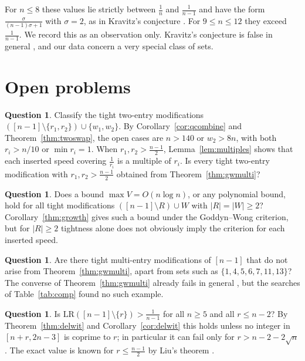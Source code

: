 \documentclass[11pt]{article}
\theoremstyle{definition}
\newtheorem{question}[theorem]{Question}
\newcommand{\LR}{\mathrm{LR}}
\begin{document}
For $n\le8$ these values lie strictly between $\frac1n$ and
$\frac1{n-1}$ and have the form $\frac\sigma{(n-1)\sigma+1}$ with
$\sigma=2$, as in Kravitz's conjecture \cite{Kravitz2021}. For $9\le
n\le12$ they exceed $\frac1{n-1}$. We record this as an observation
only. Kravitz's conjecture is false in general \cite{FanSun2026}, and
our data concern a very special class of sets.

\section{Open problems}\label{sec:open}

\begin{question}\label{q:twoswap}
Classify the tight two-entry modifications
$([n-1]\setminus\{r_1,r_2\})\cup\{w_1,w_2\}$. By
Corollary~\ref{cor:qcombine} and Theorem~\ref{thm:twoswap}, the open
cases are $n>140$ or $w_2>8n$, with both $r_i>n/10$ or $\min r_i=1$.
When $r_1,r_2>\frac{n-1}2$, Lemma~\ref{lem:multiples} shows that each
inserted speed covering $\frac1{r_i}$ is a multiple of $r_i$. Is every
tight two-entry modification with $r_1,r_2>\frac{n-1}2$ obtained from
Theorem~\ref{thm:gwmulti}?
\end{question}

\begin{question}\label{q:growth}
Does a bound $\max V=O(n\log n)$, or any polynomial bound, hold for all
tight modifications $([n-1]\setminus R)\cup W$ with $\lvert
R\rvert=\lvert W\rvert\ge2$? Corollary~\ref{thm:growth} gives such a
bound under the Goddyn--Wong criterion, but for $\lvert R\rvert\ge2$
tightness alone does not obviously imply the criterion for each
inserted speed.
\end{question}

\begin{question}\label{q:kgw}
Are there tight multi-entry modifications of $[n-1]$ that do not arise
from Theorem~\ref{thm:gwmulti}, apart from sets such as
$\{1,4,5,6,7,11,13\}$? The converse of Theorem~\ref{thm:gwmulti}
already fails in general \cite[Sec.~3]{GoddynWong2006}, but the
searches of Table~\ref{tab:comp} found no such example.
\end{question}

\begin{question}\label{q:deletion}
Is $\LR([n-1]\setminus\{r\})>\frac1{n-1}$ for all $n\ge5$ and all
$r\le n-2$? By Theorem~\ref{thm:delwit} and Corollary~\ref{cor:delwit}
this holds unless no integer in $[n+r,2n-3]$ is coprime to $r$; in
particular it can fail only for $r>n-2-2\sqrt n$. The exact value is
known for $r\le\frac{n-1}2$ by Liu's theorem \cite[Thm.~18]{Liu2008}.
\end{question}
\end{document}
